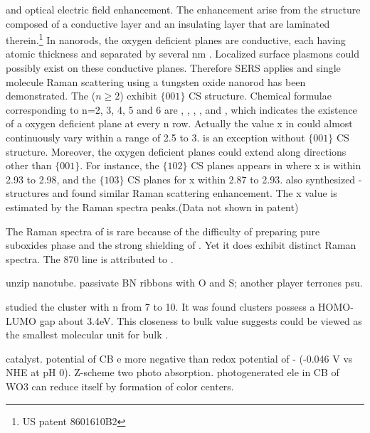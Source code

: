  and optical electric field enhancement. The enhancement arise from the structure composed of a conductive layer and an insulating layer that are laminated therein.\footnote{US patent 8601610B2} In  nanorods, the oxygen deficient planes are conductive, each having atomic thickness and separated by several nm . Localized surface plasmons could possibly exist on these conductive planes. Therefore SERS applies and single molecule Raman scattering using a tungsten oxide nanorod has been demonstrated. The  ($n \geq 2$) exhibit $\{ 001 \}$ CS structure. Chemical formulae corresponding to n=2, 3, 4, 5 and 6 are , , , , and , which indicates the existence of a oxygen deficient plane at every n row. Actually the value x in  could almost continuously vary within a range of 2.5 to 3.  is an exception without $\{ 001 \}$ CS structure. Moreover, the oxygen deficient planes could extend along directions other than $\{ 001 \}$. For instance, the $\{ 102 \}$ CS planes appears in  where x is within 2.93 to 2.98, and  the $\{ 103 \}$ CS planes for x within 2.87 to 2.93.\cite{Sloan1999}  \citeauthor{Shingaya2013} also synthesized - structures and found similar Raman scattering enhancement. The x value is estimated by the Raman spectra peaks.\cite{Shingaya2013}(Data not shown in patent)

The Raman spectra of  is rare because of the difficulty of preparing pure suboxides phase and the strong shielding of . Yet it does exhibit distinct Raman spectra. \cite{Tenne2005} The 870 line is attributed to .\cite{Hardcastle1995}

unzip nanotube. passivate BN ribbons with O and S; another player terrones psu.

\citeauthor{Huang2006} studied the  cluster with n from 7 to 10.\cite{Huang2006} It was found  clusters possess a HOMO-LUMO gap about 3.4eV. This closeness to bulk value suggests  could be viewed as the smallest molecular unit for bulk .


 catalyst.\cite{Miyauchi2013}  potential of CB e more negative than redox potential of - (-0.046 V vs NHE at pH 0). Z-scheme two photo absorption. photogenerated ele in CB of WO3 can reduce itself by formation of color centers.



